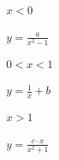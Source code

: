 \documentclass{article}
\begin{document}
$ x < 0 $
\pagebreak

$ y = \frac{a}{x^2 - 1} $
\pagebreak

$ 0 < x < 1 $
\pagebreak

$ y = \frac{1}{x} + b $
\pagebreak

$ x > 1 $
\pagebreak

$ y = \frac{c \cdot x}{x^2 + 1} $
\pagebreak
\end{document}
